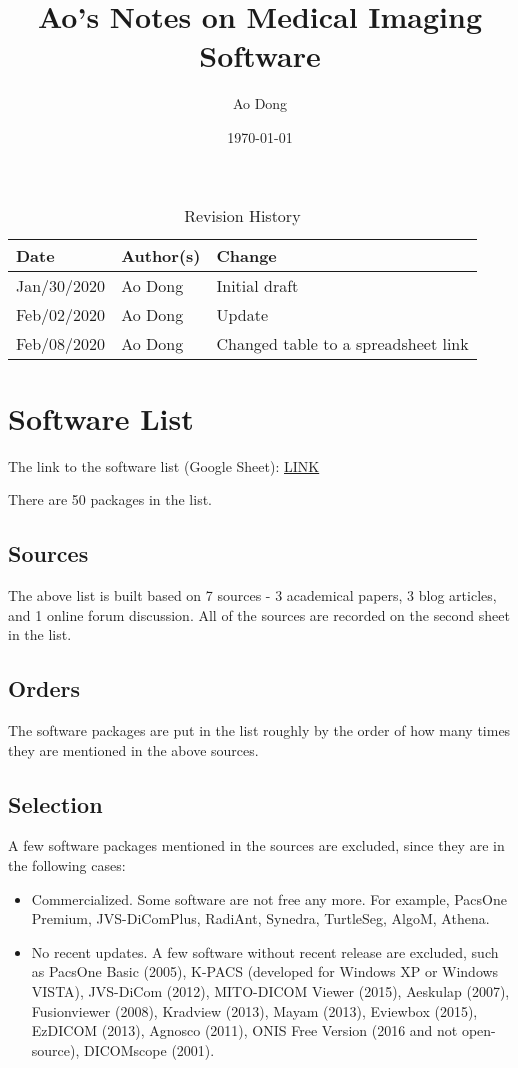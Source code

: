 \documentclass{article}
\title{Ao's Notes on Medical Imaging Software}
\author{Ao Dong}
\date{\today}
\begin{document}
\maketitle

\begin{table}[hp]
\caption{Revision History} \label{TblRevisionHistory}
\begin{tabularx}{\textwidth}{llX}
\toprule
\textbf{Date} & \textbf{Author(s)} & \textbf{Change}\\
\midrule
Jan/30/2020 & Ao Dong & Initial draft\\
Feb/02/2020 & Ao Dong & Update\\
Feb/08/2020 & Ao Dong & Changed table to a spreadsheet link\\
\bottomrule
\end{tabularx}
\end{table}

\section{Software List}

The link to the software list (Google Sheet): \href{https://docs.google.com/spreadsheets/d/122wU0v3ZtvDcqy8C4zKJ89kU-8fXAbo3Mzn6vcVXOi0/edit?usp=sharing}{LINK}

\noindent There are 50 packages in the list.

\subsection{Sources}

The above list is built based on 7 sources - 3 academical papers, 3 blog articles, and 1 online forum discussion. All of the sources are recorded on the second sheet in the list.

\subsection{Orders}

The software packages are put in the list roughly by the order of how many times they are mentioned in the above sources.

\subsection{Selection}

A few software packages mentioned in the sources are excluded, since they are in the following cases:
\begin{itemize}
    \item Commercialized. Some software are not free any more. For example, PacsOne Premium, JVS-DiComPlus, RadiAnt, Synedra, TurtleSeg, AlgoM, Athena.
    \item No recent updates. A few software without recent release are excluded, such as PacsOne Basic (2005), K-PACS (developed for Windows XP or Windows VISTA), JVS-DiCom (2012), MITO-DICOM Viewer (2015), Aeskulap (2007), Fusionviewer (2008), Kradview (2013), Mayam (2013), Eviewbox (2015), EzDICOM (2013), Agnosco (2011), ONIS Free Version (2016 and not open-source), DICOMscope (2001).
\end{itemize}
\end{document}
